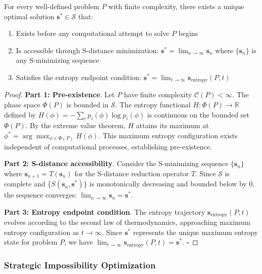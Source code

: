 ﻿\documentclass[11pt,a4paper]{article}
\begin{document}
\begin{theorem}
\label{thm:predetermined_solutions}
For every well-defined problem $P$ with finite complexity, there exists a unique optimal solution $\mathbf{s}^* \in \mathcal{S}$ that:
\begin{enumerate}
\item Exists before any computational attempt to solve $P$ begins
\item Is accessible through S-distance minimization: $\mathbf{s}^* = \lim_{n \to \infty} \mathbf{s}_n$ where $\{\mathbf{s}_n\}$ is any S-minimizing sequence
\item Satisfies the entropy endpoint condition: $\mathbf{s}^* = \lim_{t \to \infty} \mathbf{s}_{\text{entropy}}(P, t)$
\end{enumerate}
\end{theorem}

\begin{proof}
\textbf{Part 1: Pre-existence}. Let $P$ have finite complexity $\mathcal{C}(P) < \infty$. The phase space $\Phi(P)$ is bounded in $\mathcal{S}$. The entropy functional $H: \Phi(P) \to \mathbb{R}$ defined by $H(\phi) = -\sum_{i} p_i(\phi) \log p_i(\phi)$ is continuous on the bounded set $\Phi(P)$. By the extreme value theorem, $H$ attains its maximum at $\phi^* = \arg\max_{\phi \in \Phi(P)} H(\phi)$. This maximum entropy configuration exists independent of computational processes, establishing pre-existence.

\textbf{Part 2: S-distance accessibility}. Consider the S-minimizing sequence $\{\mathbf{s}_n\}$ where $\mathbf{s}_{n+1} = T(\mathbf{s}_n)$ for the S-distance reduction operator $T$. Since $\mathcal{S}$ is complete and $\{S(\mathbf{s}_n, \mathbf{s}^*)\}$ is monotonically decreasing and bounded below by 0, the sequence converges: $\lim_{n \to \infty} \mathbf{s}_n = \mathbf{s}^*$.

\textbf{Part 3: Entropy endpoint condition}. The entropy trajectory $\mathbf{s}_{\text{entropy}}(P, t)$ evolves according to the second law of thermodynamics, approaching maximum entropy configuration as $t \to \infty$. Since $\mathbf{s}^*$ represents the unique maximum entropy state for problem $P$, we have $\lim_{t \to \infty} \mathbf{s}_{\text{entropy}}(P, t) = \mathbf{s}^*$. $\square$
\end{proof}

\subsubsection{Strategic Impossibility Optimization}
\end{document}
